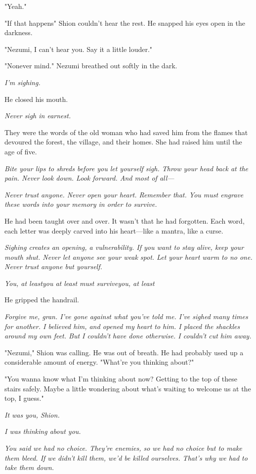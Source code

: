 "Yeah."

"If that happens\el " Shion couldn't hear the rest. He snapped his eyes
open in the darkness.

"Nezumi, I can't hear you. Say it a little louder."

"No\el never mind." Nezumi breathed out softly in the dark.

\emph{I'm sighing.}

He closed his mouth.

\emph{Never sigh in earnest.}

They were the words of the old woman who had saved him from the flames
that devoured the forest, the village, and their homes. She had raised
him until the age of five.

\emph{Bite your lips to shreds before you let yourself sigh. Throw your head
back at the pain. Never look down. Look forward. And most of all---}

\emph{Never trust anyone. Never open your heart. Remember that. You must
engrave these words into your memory in order to survive.}

He had been taught over and over. It wasn't that he had forgotten. Each
word, each letter was deeply carved into his heart---like a mantra, like a
curse.

\emph{Sighing creates an opening, a vulnerability. If you want to stay alive,
keep your mouth shut. Never let anyone see your weak spot. Let your
heart warm to no one. Never trust anyone but yourself.}

\emph{You, at least\el you at least must survive\el you, at least\el }

He gripped the handrail.

\emph{Forgive me, gran. I've gone against what you've told me. I've sighed
many times for another. I believed him, and opened my heart to him. I
placed the shackles around my own feet. But I couldn't have done
otherwise. I couldn't cut him away.}

"Nezumi," Shion was calling. He was out of breath. He had probably used
up a considerable amount of energy. "What're you thinking about?"

"You wanna know what I'm thinking about now? Getting to the top of these
stairs safely. Maybe a little wondering about what's waiting to welcome
us at the top, I guess."

\emph{It was you, Shion.}

\emph{I was thinking about you.}

\emph{You said we had no choice. They're enemies, so we had no choice but to
make them bleed. If we didn't kill them, we'd be killed ourselves.
That's why we had to take them down.}

